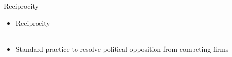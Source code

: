 \documentclass{beamer}
\begin{document}
\begin{frame}{Reciprocity}

\begin{itemize}
\item{Reciprocity}\\

\\

\justifying
\item{Standard practice to resolve political opposition from competing firms}\\

\end{itemize}




\end{frame}
\end{document}
